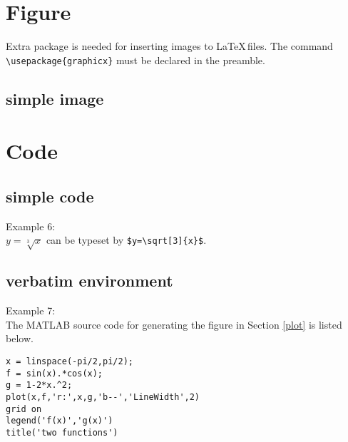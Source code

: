 \documentclass[12pt,a4paper]{article} %
\begin{document}
\section{Figure}

Extra package is needed for inserting images to \LaTeX\,files. The command 
\verb|\usepackage{graphicx}| must be declared in the preamble.

\subsection{simple image}


\section{Code}
\subsection{simple code}
Example 6:\\
$y=\sqrt[3]{x}$ can be typeset by \verb|$y=\sqrt[3]{x}$|.

\subsection{verbatim environment}
Example 7:\\
The MATLAB source code for generating the figure in Section \ref{plot} is listed below. %
\begin{verbatim}
x = linspace(-pi/2,pi/2);
f = sin(x).*cos(x);
g = 1-2*x.^2;
plot(x,f,'r:',x,g,'b--','LineWidth',2)
grid on
legend('f(x)','g(x)')
title('two functions')
\end{verbatim}
\end{document}
